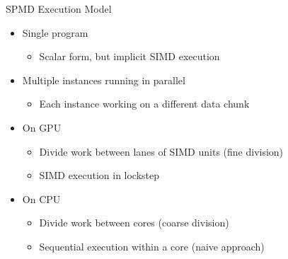 

\begin{frame}{SPMD Execution Model}

\begin{itemize}
    
    \item Single program
    \begin{itemize}
        \item Scalar form, but implicit SIMD execution
    \end{itemize}
    
    \item Multiple instances running in parallel
    \begin{itemize}
        \item Each instance working on a different data chunk
    \end{itemize}
    
    \item On GPU
    \begin{itemize}
        \item Divide work between lanes of SIMD units (fine division)
        \item SIMD execution in lockstep
    \end{itemize}
    
    \item On CPU
    \begin{itemize}
        \item Divide work between cores (coarse division)
        \item Sequential execution within a core (naive approach)
    \end{itemize}
\end{itemize}


\end{frame}

